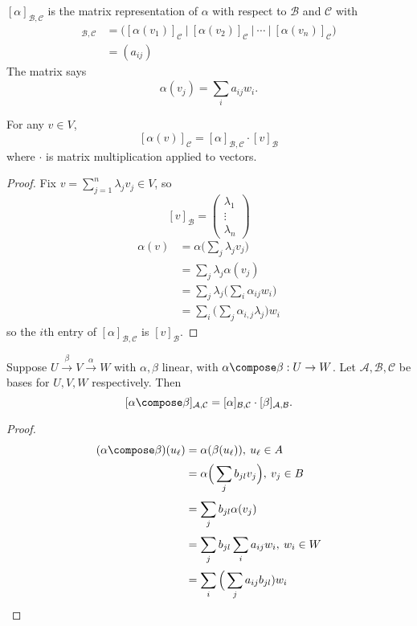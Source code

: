 \documentclass[a4paper]{article}
\newcommand*{\basis}{\mathcal}
\theoremstyle{definition}
\begin{document}
\begin{definition}
  \([\alpha]_{\basis B, \basis C}\) is the matrix representation of \(\alpha\) with respect to \(\basis B\) and \(\basis C\) with
  \begin{align*}
    [\alpha]_{\basis B, \basis C} &= \Big( [\alpha(v_1)]_{\basis C} \: \Big| \: [\alpha(v_2)]_{\basis C} \: \Big | \: \cdots \: \Big| \: [\alpha(v_n)]_{\basis C} \Big) \\
    &= (a_{ij})
  \end{align*}
  The matrix says
  \[
\alpha(v_j) = \sum_{i}^{ }a_{ij}w_i.
  \]
\end{definition}

\begin{lemma}
  For any \(v\in V\),
  \[
[\alpha(v)]_{\basis C} = [\alpha]_{\basis B, \basis C}\cdot [v]_{\basis B}
  \]
  where \(\cdot\) is matrix multiplication applied to vectors.
\end{lemma}

\begin{proof}
  Fix \(v =\sum_{j=1}^{n}\lambda_jv_j \in V\), so
  \[
[v]_{\basis B} =
\begin{pmatrix}
  \lambda_1 \\
  \vdots \\
  \lambda_n
\end{pmatrix}
\]
\begin{align*}
  \alpha(v) &= \alpha\Big( \sum_{j}^{ }\lambda_jv_j \Big) \\
            &= \sum_{j}^{ }\lambda_j\alpha(v_j) \\
            &= \sum_{j}^{ }\lambda_j\Big( \sum_{i}^{ }\alpha_{ij}w_i \Big) \\
            &= \sum_{i}^{ }\Big( \sum_{j}^{} \alpha_{i,j}\lambda_j \Big) w_i
\end{align*}
so the \(i\)th entry of \([\alpha]_{\basis B, \basis C}\) is \([v]_{\basis B}\).
\end{proof}

\begin{lemma}
  Suppose \(U \stackrel{\beta}{\to} V \stackrel{\alpha}{\to} W\) with \(\alpha, \beta\) linear, with \(\alpha\compose\beta: U\to W\). Let \(\basis A, \basis B, \basis C\) be bases for \(U,V,W\) respectively. Then
  \[
[\alpha\compose\beta]_{\basis A, \basis C} = [\alpha]_{\basis B,\basis C}\cdot[\beta]_{\basis A, \basis B}.
  \]
\end{lemma}

\begin{proof}
  \begin{align*}
    (\alpha\compose\beta)(u_\ell) &= \alpha(\beta(u_\ell)), \: u_\ell\in A\\
                                  &= \alpha\Big( \sum_{j}^{ }b_{jl}v_j \Big), \: v_j\in B \\
                                  &= \sum_{j}^{ }b_{jl}\alpha(v_j) \\
                                  &= \sum_{j}^{ }b_{jl}\sum_{i}^{ }a_{ij}w_i, \: w_i\in W \\
                                  &= \sum_{i}^{ }\Big( \sum_{j}^{ }a_{ij}b_{jl})w_i
  \end{align*}
\end{proof}
\end{document}
